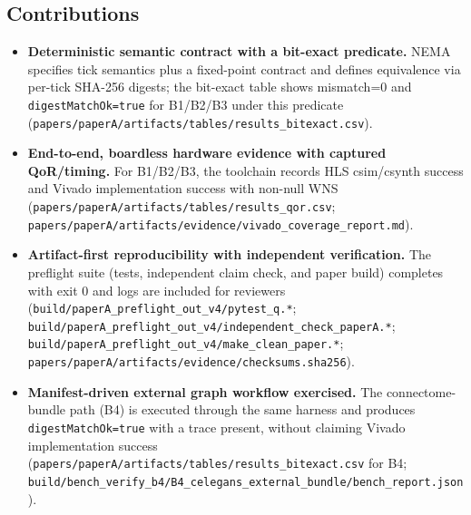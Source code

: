 \subsection{Contributions}
\begin{itemize}
\item \textbf{Deterministic semantic contract with a bit-exact predicate.} NEMA specifies tick semantics plus a fixed-point contract and defines equivalence via per-tick SHA-256 digests; the bit-exact table shows mismatch=0 and \texttt{digestMatchOk=true} for B1/B2/B3 under this predicate (\texttt{papers/paperA/artifacts/tables/results\_bitexact.csv}).
\item \textbf{End-to-end, boardless hardware evidence with captured QoR/timing.} For B1/B2/B3, the toolchain records HLS csim/csynth success and Vivado implementation success with non-null WNS (\texttt{papers/paperA/artifacts/tables/results\_qor.csv}; \texttt{papers/paperA/artifacts/evidence/vivado\_coverage\_report.md}).
\item \textbf{Artifact-first reproducibility with independent verification.} The preflight suite (tests, independent claim check, and paper build) completes with exit 0 and logs are included for reviewers (\texttt{build/paperA\_preflight\_out\_v4/pytest\_q.*}; \texttt{build/paperA\_preflight\_out\_v4/independent\_check\_paperA.*}; \texttt{build/paperA\_preflight\_out\_v4/make\_clean\_paper.*}; \texttt{papers/paperA/artifacts/evidence/checksums.sha256}).
\item \textbf{Manifest-driven external graph workflow exercised.} The connectome-bundle path (B4) is executed through the same harness and produces \texttt{digestMatchOk=true} with a trace present, without claiming Vivado implementation success (\texttt{papers/paperA/artifacts/tables/results\_bitexact.csv} for B4; \texttt{build/bench\_verify\_b4/B4\_celegans\_external\_bundle/bench\_report.json}).
\end{itemize}

